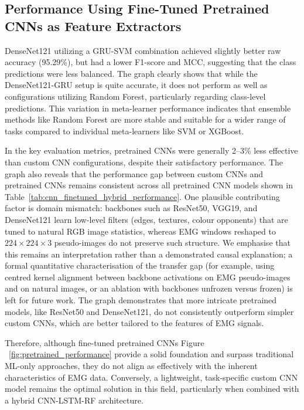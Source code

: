 \documentclass{elektr}
\newcommand{\yh}[1]{#1}
\begin{document}
\subsection{Performance Using Fine-Tuned Pretrained CNNs as Feature Extractors}

DenseNet121 utilizing a GRU-SVM combination achieved slightly better raw accuracy (95.29\%), but had a lower F1-score and MCC, suggesting that the class predictions were less balanced. The graph clearly shows that while the DenseNet121-GRU setup is quite accurate, it does not perform as well as configurations utilizing Random Forest, particularly regarding class-level predictions. This variation in meta-learner performance indicates that ensemble methods like Random Forest are more stable and suitable for a wider range of tasks compared to individual meta-learners like SVM or XGBoost.

In the key evaluation metrics, pretrained CNNs were generally 2–3\% less effective than custom CNN configurations, despite their satisfactory performance. The graph also reveals that the performance gap between custom CNNs and pretrained CNNs remains consistent across all pretrained CNN models shown in Table~\ref{tab:cnn_finetuned_hybrid_performance}. \yh{One plausible contributing factor is domain mismatch: backbones such as ResNet50, VGG19, and DenseNet121 learn low-level filters (edges, textures, colour opponents) that are tuned to natural RGB image statistics, whereas EMG windows reshaped to $224\times224\times3$ pseudo-images do not preserve such structure. We emphasise that this remains an interpretation rather than a demonstrated causal explanation; a formal quantitative characterisation of the transfer gap (for example, using centred kernel alignment between backbone activations on EMG pseudo-images and on natural images, or an ablation with backbones unfrozen versus frozen) is left for future work.} The graph demonstrates that more intricate pretrained models, like ResNet50 and DenseNet121, do not consistently outperform simpler custom CNNs, which are better tailored to the features of EMG signals.

Therefore, although fine-tuned pretrained CNNs Figure ~\ref{fig:pretrained_performance} provide a solid foundation and surpass traditional ML-only approaches, they do not align as effectively with the inherent characteristics of EMG data. Conversely, a lightweight, task-specific custom CNN model remains the optimal solution in this field, particularly when combined with a hybrid CNN-LSTM-RF architecture.
\end{document}
